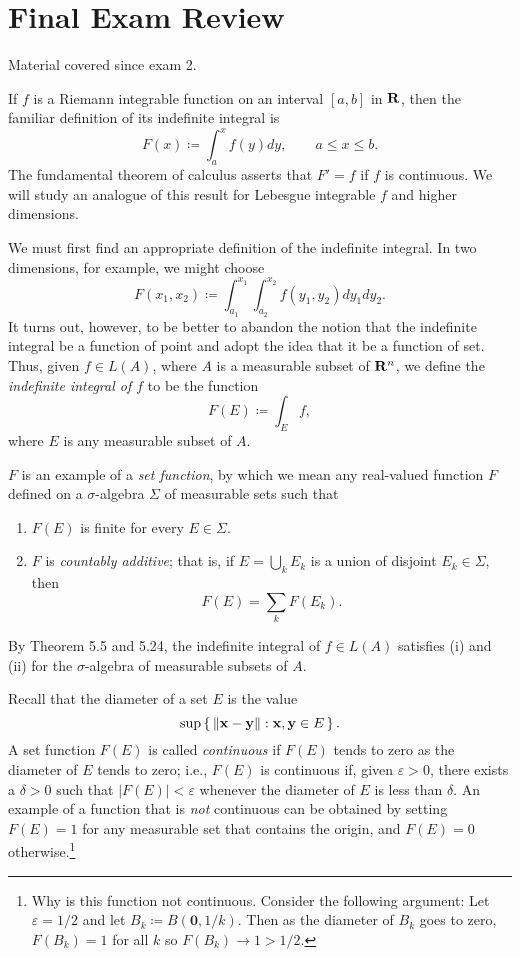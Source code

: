 \section{Final Exam Review}
Material covered since exam 2.

\bigskip

If $f$ is a Riemann integrable function on an interval $[a,b]$ in $\mathbf{R}$,
then the familiar definition of its indefinite integral is
\[
F(x)\coloneqq\int_a^x f(y)dy,\qquad a\leq x\leq b.
\]
The fundamental theorem of calculus asserts that $F'=f$ if $f$ is
continuous. We will study an analogue of this result for Lebesgue
integrable $f$ and higher dimensions.

We must first find an appropriate definition of the indefinite integral. In
two dimensions, for example, we might choose
\[
F(x_1,x_2)\coloneqq\int_{a_1}^{x_1}\int_{a_2}^{x_2}f(y_1,y_2)dy_1dy_2.
\]
It turns out, however, to be better to abandon the notion that the
indefinite integral be a function of point and adopt the idea that it be a
function of set. Thus, given $f\in L(A)$, where $A$ is a measurable
subset of $\mathbf{R}^n$, we define the \emph{indefinite integral of $f$} to be
the function
\[
F(E)\coloneqq\int_E f,
\]
where $E$ is any measurable subset of $A$.

$F$ is an example of a \emph{set function}, by which we mean any
real-valued function $F$ defined on a $\sigma$-algebra $\Sigma$ of
measurable sets such that
\begin{enumerate}[label=(\roman*)]
\item $F(E)$ is finite for every $E\in\Sigma$.
\item $F$ is \emph{countably additive}; that is, if $E=\bigcup_k E_k$ is a
  union of disjoint $E_k\in\Sigma$, then
\[
F(E)=\sum_k F(E_k).
\]
\end{enumerate}
By Theorem 5.5 and 5.24, the indefinite integral of $f\in L(A)$ satisfies
(i) and (ii) for the $\sigma$-algebra of measurable subsets of $A$.

Recall that the diameter of a set $E$ is the value
\[
\sup\left\{\,\|\mathbf{x}-\mathbf{y}\|:\mathbf{x},\mathbf{y}\in E\,\right\}.
\]
A set function $F(E)$ is called \emph{continuous} if $F(E)$ tends to zero
as the diameter of $E$ tends to zero; i.e., $F(E)$ is continuous if, given
$\varepsilon>0$, there exists a $\delta>0$ such that $|F(E)|<\varepsilon$
whenever the diameter of $E$ is less than $\delta$. An example of a
function that is \emph{not} continuous can be obtained by setting $F(E)=1$
for any measurable set that contains the origin, and $F(E)=0$
otherwise.\footnote{Why is this function not continuous. Consider the
  following argument: Let $\varepsilon=1/2$ and let $B_k\coloneqq
  B(\mathbf{0},1/k)$. Then as the diameter of $B_k$ goes to zero,
  $F(B_k)=1$ for all $k$ so $F(B_k)\to 1>1/2$.}

